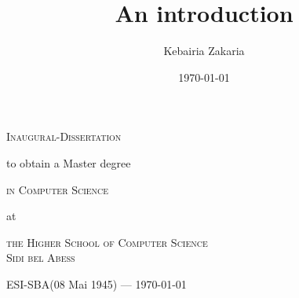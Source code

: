 \documentclass{mimosis}
\author{Kebairia Zakaria}
\date{\today}
\title{An introduction}
\numberwithin{equation}{chapter}
\numberwithin{listing}{chapter}
\begin{document}
\setcounter{tocdepth}{1}
 \frontmatter
\glsenablehyper
{}

\begin{titlepage}
	\begin{center}
		\textsc{\huge Inaugural-Dissertation}
                \vskip 1cm
                \begin{large}
                  to obtain a Master degree\\[0.50cm]
                  \begin{Large}
                    \textsc{in Computer Science}\\[0.50cm]
                  \end{Large}
                  at\\[0.50cm]
                  \begin{Large}
                    \textsc{the Higher School of Computer Science\\Sidi bel Abess}\par
                  \end{Large}
                \end{large}
		\vfill
    \vskip 1cm
    \begin{small}
      ESI-SBA(08 Mai 1945) --- \today
    \end{small}
	\end{center}
\end{titlepage}
\end{document}
